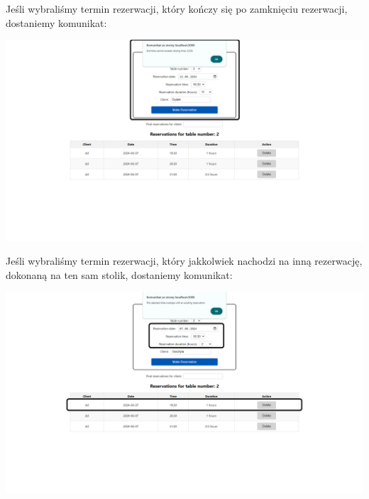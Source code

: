 \documentclass[12pt]{article}
\begin{document}
\begin{minipage}{\textwidth}
\noindent Jeśli wybraliśmy termin rezerwacji, który kończy się po zamknięciu rezerwacji, dostaniemy komunikat:
\begin{center}
\includegraphics[width=\textwidth]{media/Reservations_tooLong.png}
\end{center}
\end{minipage}

\begin{minipage}{\textwidth}
\noindent Jeśli wybraliśmy termin rezerwacji, który jakkolwiek nachodzi na inną rezerwację, dokonaną na ten sam stolik, dostaniemy komunikat:
\begin{center}
\includegraphics[width=\textwidth]{media/Reservations_overlap.png}
\end{center}
\end{minipage}
\end{document}
